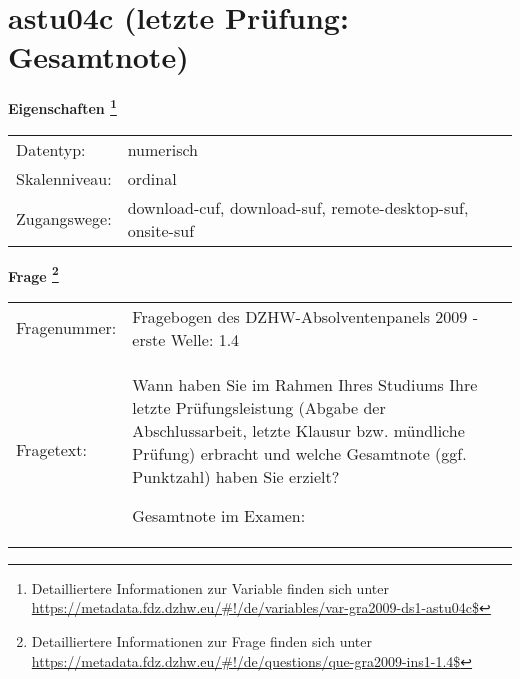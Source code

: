 
    \setcounter{footnote}{0}

    \vspace*{-1.8cm}
	\section{astu04c (letzte Prüfung: Gesamtnote)}
	\label{section:astu04c}



    \vspace*{0.5cm}
    \noindent\textbf{Eigenschaften
	\footnote{Detailliertere Informationen zur Variable finden sich unter
		\url{https://metadata.fdz.dzhw.eu/\#!/de/variables/var-gra2009-ds1-astu04c$}}}\\
	\begin{tabularx}{\hsize}{@{}lX}
	Datentyp: & numerisch \\
	Skalenniveau: & ordinal \\
	Zugangswege: &
	  download-cuf, 
	  download-suf, 
	  remote-desktop-suf, 
	  onsite-suf
 \\
    \end{tabularx}



				\vspace*{0.5cm}
                \noindent\textbf{Frage
	                \footnote{Detailliertere Informationen zur Frage finden sich unter
		              \url{https://metadata.fdz.dzhw.eu/\#!/de/questions/que-gra2009-ins1-1.4$}}}\\
				\begin{tabularx}{\hsize}{@{}lX}
					Fragenummer: &
					  Fragebogen des DZHW-Absolventenpanels 2009 - erste Welle:
					  1.4
 \\
					Fragetext: & Wann haben Sie im Rahmen Ihres Studiums Ihre letzte Prüfungsleistung (Abgabe der Abschlussarbeit, letzte Klausur bzw. mündliche Prüfung) erbracht und welche Gesamtnote (ggf. Punktzahl) haben Sie erzielt?\par  Gesamtnote im Examen: \\
				\end{tabularx}





